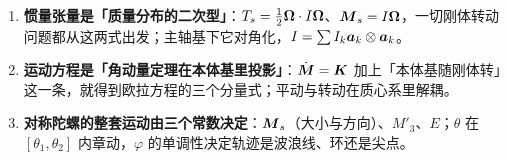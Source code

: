 \documentclass[11pt]{ctexart}
\begin{document}



\begin{enumerate}
\item \textbf{惯量张量是「质量分布的二次型」}：$T_s=\frac12\boldsymbol{\Omega}\cdot I\boldsymbol{\Omega}$、$\boldsymbol{M}_s=I\boldsymbol{\Omega}$，一切刚体转动问题都从这两式出发；主轴基下它对角化，$I=\sum I_k\boldsymbol{a}_k\otimes\boldsymbol{a}_k$。
\item \textbf{运动方程是「角动量定理在本体基里投影」}：$\dot{\boldsymbol{M}}=\boldsymbol{K}$ 加上「本体基随刚体转」这一条，就得到欧拉方程的三个分量式；平动与转动在质心系里解耦。
\item \textbf{对称陀螺的整套运动由三个常数决定}：$\boldsymbol{M}_s$（大小与方向）、$M'_3$、$E$；$\theta$ 在 $[{\theta_1},{\theta_2}]$ 内章动，$\varphi$ 的单调性决定轨迹是波浪线、环还是尖点。
\end{enumerate}

\end{document}
